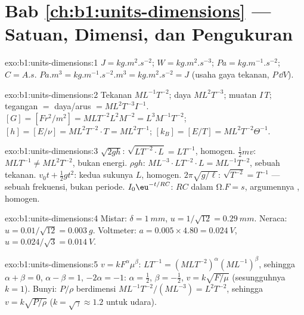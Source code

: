 \section*{Bab \ref{ch:b1:units-dimensions} --- Satuan, Dimensi, dan Pengukuran}

\begin{solution}{exo:b1:units-dimensions:1}
$\unit{J} = \unit{kg.m^2.s^{-2}}$; $\unit{W} = \unit{kg.m^2.s^{-3}}$;
$\unit{Pa} = \unit{kg.m^{-1}.s^{-2}}$; $\unit{C} = \unit{A.s}$.
$\unit{Pa.m^3} = \unit{kg.m^{-1}.s^{-2}.m^3} = \unit{kg.m^2.s^{-2}} = \unit{J}$
(usaha gaya tekanan, $P\,\dd V$).
\end{solution}

\begin{solution}{exo:b1:units-dimensions:2}
Tekanan $M L^{-1} T^{-2}$; daya $M L^2 T^{-3}$; muatan $I\,T$;
tegangan $=$ daya/arus $= M L^2 T^{-3} I^{-1}$.
$[G] = [F r^2/m^2] = M L T^{-2} L^2 M^{-2} = L^3 M^{-1} T^{-2}$;
$[h] = [E/\nu] = M L^2 T^{-2} \cdot T = M L^2 T^{-1}$;
$[k_B] = [E/T] = M L^2 T^{-2} \Theta^{-1}$.
\end{solution}

\begin{solution}{exo:b1:units-dimensions:3}
$\sqrt{2gh}$: $\sqrt{L T^{-2} \cdot L} = L T^{-1}$, homogen.
$\tfrac12 mv$: $M L T^{-1} \neq M L^2 T^{-2}$, bukan energi.
$\rho g h$: $M L^{-3} \cdot L T^{-2} \cdot L = M L^{-1} T^{-2}$, sebuah tekanan.
$v_0 t + \tfrac12 g t^2$: kedua sukunya $L$, homogen.
$2\pi\sqrt{g/\ell}$: $\sqrt{T^{-2}} = T^{-1}$ --- sebuah frekuensi, bukan periode.
$I_0\eu^{-t/RC}$: $RC$ dalam $\unit{\ohm.F} = \unit{s}$, argumennya , homogen.
\end{solution}

\begin{solution}{exo:b1:units-dimensions:4}
Mistar: $\delta = \qty{1}{mm}$, $u = 1/\sqrt{12} = \qty{0.29}{mm}$.
Neraca: $u = 0.01/\sqrt{12} = \qty{0.003}{g}$.
Voltmeter: $a = 0.005 \times 4.80 = \qty{0.024}{V}$,
$u = 0.024/\sqrt3 = \qty{0.014}{V}$.
\end{solution}

\begin{solution}{exo:b1:units-dimensions:5}
$v = k F^\alpha \mu^\beta$: $L T^{-1} = (M L T^{-2})^\alpha (M L^{-1})^\beta$,
sehingga $\alpha + \beta = 0$, $\alpha - \beta = 1$, $-2\alpha = -1$:
$\alpha = \tfrac12$, $\beta = -\tfrac12$, $v = k\sqrt{F/\mu}$ (sesungguhnya $k = 1$).
Bunyi: $P/\rho$ berdimensi $M L^{-1} T^{-2} / (M L^{-3}) = L^2 T^{-2}$,
sehingga $v = k\sqrt{P/\rho}$ ($k = \sqrt\gamma \approx 1.2$ untuk udara).
\end{solution}

